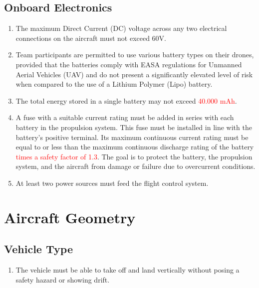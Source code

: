 \documentclass{article}
\begin{document}
\subsection{Onboard Electronics}
\begin{enumerate}
  \item The maximum Direct Current (DC) voltage across any two electrical connections on the aircraft must not exceed 60V.
  \item Team participants are permitted to use various battery types on their drones, provided that the batteries comply with EASA regulations for Unmanned Aerial Vehicles (UAV) and do not present a significantly elevated level of risk when compared to the use of a Lithium Polymer (Lipo) battery. 
  \item The total energy stored in a single battery may not exceed \textcolor{red}{40.000 mAh}.
  \item A fuse with a suitable current rating must be added in series with each battery in the propulsion system. 
  This fuse must be installed in line with the battery's positive terminal. Its maximum continuous current rating must be equal to or less than the maximum continuous discharge rating of the battery \textcolor{red}{times a safety factor of 1.3}. The goal is to protect the battery, the propulsion system, and the aircraft from damage or failure due to overcurrent conditions.
  \item At least two power sources must feed the flight control system. 
\end{enumerate}



\section{Aircraft Geometry}

\subsection{Vehicle Type}
\begin{enumerate}
  \item The vehicle must be able to take off and land vertically without posing a safety hazard or showing drift.  
\end{enumerate}
\end{document}
